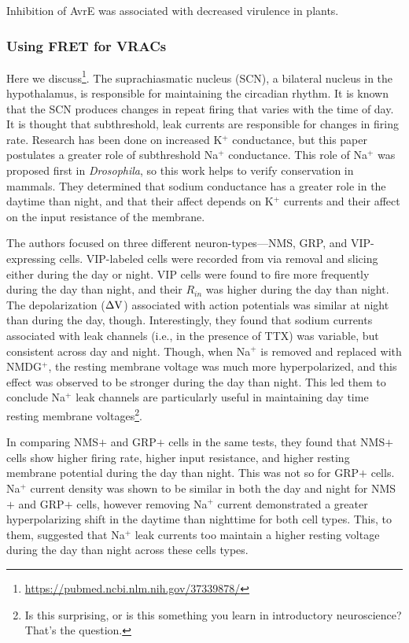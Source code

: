 Inhibition of AvrE was associated with decreased virulence in plants. 

\subsubsection{Using FRET for VRACs}

Here we discuss\footnote{\url{https://pubmed.ncbi.nlm.nih.gov/37339878/}}. The suprachiasmatic nucleus (SCN), a bilateral nucleus in the hypothalamus, is responsible for maintaining the circadian rhythm. It is known that the SCN produces changes in repeat firing that varies with the time of day. It is thought that subthreshold, leak currents are responsible for changes in firing rate. Research has been done on increased K$^+$ conductance, but this paper postulates a greater role of subthreshold Na$^+$ conductance. This role of Na$^+$ was proposed first in \textit{Drosophila}, so this work helps to verify conservation in mammals. They determined that sodium conductance has a greater role in the daytime than night, and that their affect depends on K$^+$ currents and their affect on the input resistance of the membrane.\newline

The authors focused on three different neuron-types---NMS, GRP, and VIP-expressing cells. VIP-labeled cells were recorded from via removal and slicing either during the day or night. VIP cells were found to fire more frequently during the day than night, and their $R_{in}$ was higher during the day than night. The depolarization ($\Delta {\rm V}$) associated with action potentials was similar at night than during the day, though. Interestingly, they found that sodium currents associated with leak channels (i.e., in the presence of TTX) was variable, but consistent across day and night. Though, when Na$^+$ is removed and replaced with NMDG$^+$, the resting membrane voltage was much more hyperpolarized, and this effect was observed to be stronger during the day than night. This led them to conclude Na$^+$ leak channels are particularly useful in maintaining day time resting membrane voltages\footnote{Is this surprising, or is this something you learn in introductory neuroscience? That's the question.}.\newline

In comparing NMS$+$ and GRP$+$ cells in the same tests, they found that NMS$+$ cells show higher firing rate, higher input resistance, and higher resting membrane potential during the day than night. This was not so for GRP$+$ cells. Na$^+$ current density was shown to be similar in both the day and night for NMS$+$ and GRP$+$ cells, however removing Na$^+$ current demonstrated a greater hyperpolarizing shift in the daytime than nighttime for both cell types. This, to them, suggested that Na$^+$ leak currents too maintain a higher resting voltage during the day than night across these cells types. 


